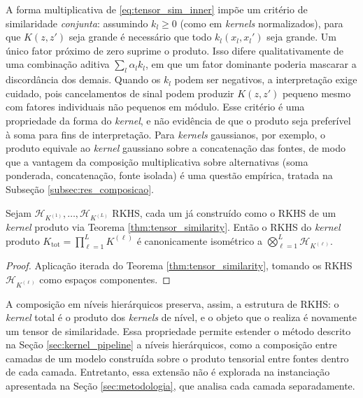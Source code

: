 \begin{remark}\label{rem:joint_similarity}
A forma multiplicativa de \eqref{eq:tensor_sim_inner} impõe um critério de similaridade \emph{conjunta}: assumindo $k_l \geq 0$ (como em \textit{kernels} normalizados), para que $K(z, z')$ seja grande é necessário que todo $k_l(x_l, x_l')$ seja grande. Um único fator próximo de zero suprime o produto. Isso difere qualitativamente de uma combinação aditiva $\sum_l \alpha_l k_l$, em que um fator dominante poderia mascarar a discordância dos demais. Quando os $k_l$ podem ser negativos, a interpretação exige cuidado, pois cancelamentos de sinal podem produzir $K(z,z')$ pequeno mesmo com fatores individuais não pequenos em módulo. Esse critério é uma propriedade da forma do \textit{kernel}, e não evidência de que o produto seja preferível à soma para fins de interpretação. Para \textit{kernels} gaussianos, por exemplo, o produto equivale ao \textit{kernel} gaussiano sobre a concatenação das fontes, de modo que a vantagem da composição multiplicativa sobre alternativas (soma ponderada, concatenação, fonte isolada) é uma questão empírica, tratada na Subseção \ref{subsec:res_composicao}.
\end{remark}

\begin{corollary}\label{cor:recursive_composition}
Sejam $\mathcal{H}_{K^{(1)}}, \dots, \mathcal{H}_{K^{(L)}}$ RKHS, cada um já construído como o RKHS de um \textit{kernel} produto via Teorema \ref{thm:tensor_similarity}. Então o RKHS do \textit{kernel} produto $K_{\mathrm{tot}} = \prod_{\ell=1}^{L} K^{(\ell)}$ é canonicamente isométrico a $\bigotimes_{\ell=1}^{L} \mathcal{H}_{K^{(\ell)}}$.
\end{corollary}

\begin{proof}
Aplicação iterada do Teorema \ref{thm:tensor_similarity}, tomando os RKHS $\mathcal{H}_{K^{(\ell)}}$ como espaços componentes.
\end{proof}

A composição em níveis hierárquicos preserva, assim, a estrutura de RKHS: o \textit{kernel} total é o produto dos \textit{kernels} de nível, e o objeto que o realiza é novamente um tensor de similaridade. Essa propriedade permite estender o método descrito na Seção \ref{sec:kernel_pipeline} a níveis hierárquicos, como a composição entre camadas de um modelo construída sobre o produto tensorial entre fontes dentro de cada camada. Entretanto, essa extensão não é explorada na instanciação apresentada na Seção \ref{sec:metodologia}, que analisa cada camada separadamente.

